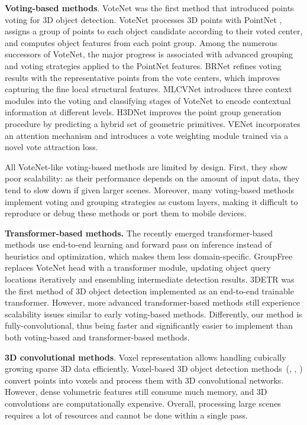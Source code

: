 \documentclass[runningheads]{llncs}
\begin{document}
\textbf{Voting-based methods}. VoteNet \cite{qi2019votenet} was the first method that introduced points voting for 3D object detection. VoteNet processes 3D points with PointNet \cite{qi2017pointnet}, assigns a group of points to each object candidate according to their voted center, and computes object features from each point group. Among the numerous successors of VoteNet, the major progress is associated with advanced grouping and voting strategies applied to the PointNet features. BRNet \cite{cheng2021brnet} refines voting results with the representative points from the vote centers, which improves capturing the fine local structural features. MLCVNet \cite{xie2020mlcvnet} introduces three context modules into the voting and classifying stages of VoteNet to encode contextual information at different levels. H3DNet \cite{zhang2020h3dnet} improves the point group generation procedure by predicting a hybrid set of geometric primitives. VENet \cite{xie2021venet} incorporates an attention mechanism and introduces a vote weighting module trained via a novel vote attraction loss.

All VoteNet-like voting-based methods are limited by design. First, they show poor scalability: as their performance depends on the amount of input data, they tend to slow down if given larger scenes. Moreover, many voting-based methods implement voting and grouping strategies as custom layers, making it difficult to reproduce or debug these methods or port them to mobile devices. 

\textbf{Transformer-based methods.} The recently emerged transformer-based methods use end-to-end learning and forward pass on inference instead of heuristics and optimization, which makes them less domain-specific. GroupFree \cite{liu2021group-free} replaces VoteNet head with a transformer module, updating object query locations iteratively and ensembling intermediate detection results. 3DETR \cite{misra20213detr} was the first method of 3D object detection implemented as an end-to-end trainable transformer. However, more advanced transformer-based methods still experience scalability issues similar to early voting-based methods. Differently, our method is fully-convolutional, thus being faster and significantly easier to implement than both voting-based and transformer-based methods.

\textbf{3D convolutional methods}. Voxel representation allows handling cubically growing sparse 3D data efficiently. Voxel-based 3D object detection methods~(\cite{hou20193dsis}, \cite{maturana2015voxnet}, \cite{shen2020frustum}) convert points into voxels and process them with 3D convolutional networks. However, dense volumetric features still consume much memory, and 3D convolutions are computationally expensive. Overall, processing large scenes requires a lot of resources and cannot be done within a single pass.
\end{document}
